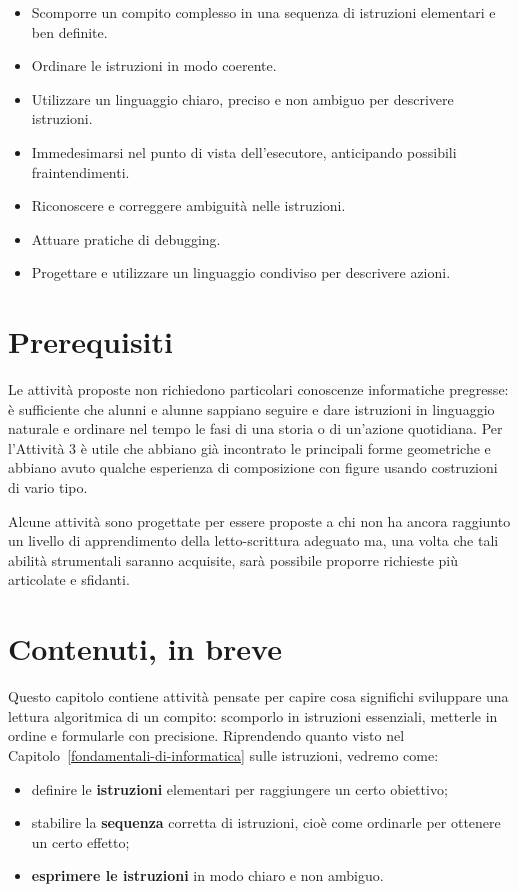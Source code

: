 \begin{itemize}
\item
  Scomporre un compito complesso in una sequenza di istruzioni elementari e ben definite.
\item
  Ordinare le istruzioni in modo coerente.
\item
  Utilizzare un linguaggio chiaro, preciso e non ambiguo per descrivere istruzioni.
\item
  Immedesimarsi nel punto di vista dell'esecutore, anticipando possibili fraintendimenti.
\item
  Riconoscere e correggere ambiguità nelle istruzioni.
\item
  Attuare pratiche di debugging.
\item
  Progettare e utilizzare un linguaggio condiviso per descrivere azioni.
\end{itemize}

\section{Prerequisiti }\label{prerequisiti}

Le attività proposte non richiedono particolari conoscenze informatiche pregresse: è sufficiente che alunni e alunne sappiano seguire e dare istruzioni in linguaggio naturale e ordinare nel tempo le fasi di una storia o di un'azione quotidiana. Per l'Attività 3 è utile che abbiano già incontrato le principali forme geometriche e abbiano avuto qualche esperienza di composizione con figure usando costruzioni di vario tipo.

Alcune attività sono progettate per essere proposte a chi non ha ancora raggiunto un livello di apprendimento della letto-scrittura adeguato ma, una volta che tali abilità strumentali saranno acquisite, sarà possibile proporre richieste più articolate e sfidanti.

\section{Contenuti, in breve }\label{contenuti-in-breve}

Questo capitolo contiene attività pensate per capire cosa significhi sviluppare una lettura algoritmica di un compito: scomporlo in istruzioni essenziali, metterle in ordine e formularle con precisione. Riprendendo quanto visto nel Capitolo~\ref{fondamentali-di-informatica} sulle istruzioni, vedremo come:

\begin{itemize}
\item
  definire le \textbf{istruzioni} elementari per raggiungere un certo obiettivo;
\item
  stabilire la \textbf{sequenza} corretta di istruzioni, cioè come ordinarle per ottenere un certo effetto;
\item
  \textbf{esprimere le istruzioni} in modo chiaro e non ambiguo.
\end{itemize}

